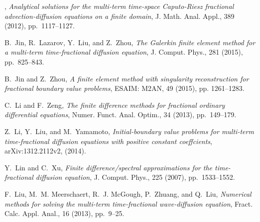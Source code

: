 \documentclass[10pt]{siamltex}
\begin{document}
\begin{thebibliography}{10}
\leavevmode\vrule height 2pt depth -1.6pt width 23pt, {\em Analytical solutions
  for the multi-term time-space {C}aputo-{R}iesz fractional advection-diffusion
  equations on a finite domain}, J. Math. Anal. Appl., 389 (2012),
  pp.~1117--1127.

{\sc B.~Jin, R.~Lazarov, Y.~Liu, and Z.~Zhou}, {\em The {G}alerkin finite
  element method for a multi-term time-fractional diffusion equation}, J.
  Comput. Phys., 281 (2015), pp.~825--843.

{\sc B.~Jin and Z.~Zhou}, {\em A finite element method with singularity
  reconstruction for fractional boundary value problems},
  ESAIM: M2AN, 49 (2015), pp. 1261--1283.

{\sc C.~Li and F.~Zeng}, {\em The finite difference methods for fractional
  ordinary differential equations}, Numer. Funct. Anal. Optim., 34 (2013),
  pp.~149--179.


{\sc Z.~Li, Y.~Liu, and M.~Yamamoto}, {\em Initial-boundary value problems for
  multi-term time-fractional diffusion equations with positive constant
  coeffcients}, arXiv:1312.2112v2,  (2014).

{\sc Y.~Lin and C.~Xu}, {\em Finite difference/spectral approximations for the
  time-fractional diffusion equation}, J. Comput. Phys., 225 (2007),
  pp.~1533--1552.



{\sc F.~Liu, M.~M. Meerschaert, R.~J. McGough, P.~Zhuang, and Q.~Liu}, {\em
  Numerical methods for solving the multi-term time-fractional wave-diffusion
  equation}, Fract. Calc. Appl. Anal., 16 (2013), pp.~9--25.



\end{thebibliography}
\end{document}
